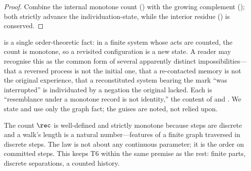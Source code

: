 \begin{proof}
Combine the internal monotone count () with the growing
complement (); both strictly advance the
individuation-state, while the interior residue () is conserved.
\end{proof}

\begin{remark}
\label{rem:onelaw}
 is a single order-theoretic fact: in a finite system whose
acts are counted, the count is monotone, so a revisited configuration is a new
state. A reader may recognise this as the common form of several apparently
distinct impossibilities---that a reversed process is not the initial one, that a
re-contacted memory is not the original experience, that a reconstituted system
bearing the mark ``was interrupted'' is individuated by a negation the original
lacked. Each is ``resemblance under a monotone record is not identity,'' the
content of  and . We state and use only
the graph fact; the guises are noted, not relied upon.
\end{remark}

\begin{remark}
\label{rem:nonreturn-finite}
The count $\rec$ is well-defined and strictly monotone because steps are
discrete and a walk's length is a natural number---features of a finite graph
traversed in discrete steps. The law is not about any continuous parameter; it is
the order on committed steps. This keeps T6 within the same premise as the rest:
finite parts, discrete separations, a counted history.
\end{remark}
